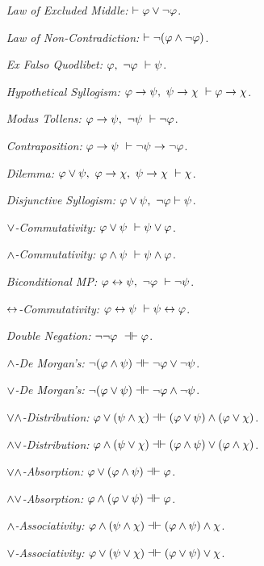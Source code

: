 \documentclass[a4paper, 11pt]{article} %
\begin{document}
\begin{multicols}{2}
\begin{enumerate}[leftmargin=1.5in]
  \item[\it Law of Excluded Middle:] $\vdash \varphi\vee\neg\varphi$.
  \item[\it Law of Non-Contradiction:] $\vdash \neg(\varphi\wedge\neg\varphi)$.
  \item[\it Ex Falso Quodlibet:] $\varphi,\ \neg\varphi\ \vdash \psi$.
  \item[\it Hypothetical Syllogism:] $\metaA \eif \metaB,\ \metaB \eif \metaC\ \vdash \metaA \eif \metaC$.
  \item[\it Modus Tollens:] $\varphi \rightarrow \psi,\ \neg\psi\ \vdash \neg\varphi$.
  \item[\it Contraposition:] $\varphi \rightarrow \psi\ \vdash \neg\psi \rightarrow \neg\varphi$.
  \item[\it Dilemma:] $\varphi \vee \psi,\ \varphi \rightarrow \chi,\ \psi \rightarrow \chi\ \vdash \chi$.
  \item[\it Disjunctive Syllogism:] $\varphi \vee \psi,\ \neg \varphi \vdash \psi$.
  \item[\it $\vee$-Commutativity:] $\varphi \vee \psi\ \vdash \psi \vee \varphi$.
  \item[\it $\wedge$-Commutativity:] $\varphi \wedge \psi\ \vdash \psi \wedge \varphi$.
  \item[\it Biconditional MP:] $\varphi \leftrightarrow \psi,\ \neg\varphi\ \vdash \neg\psi$.
  \item[\it $\leftrightarrow$-Commutativity:] $\varphi \leftrightarrow \psi\ \vdash \psi \leftrightarrow \varphi$.
  \item[\it Double Negation:] $\neg\neg\varphi\ \dashv\vdash \varphi$.
  \item[\it $\wedge$-De Morgan's:] $\neg(\varphi\wedge\psi)\dashv\vdash\neg\varphi\vee\neg\psi$.
  \item[\it $\vee$-De Morgan's:] $\neg(\varphi\vee\psi)\dashv\vdash\neg\varphi\wedge\neg\psi$.
  \item[\it ${\vee}{\wedge}$-Distribution:] $\varphi\vee(\psi\wedge\chi) \dashv\vdash (\varphi\vee\psi)\wedge(\varphi\vee\chi)$.
  \item[\it ${\wedge}{\vee}$-Distribution:] $\varphi\wedge(\psi\vee\chi) \dashv\vdash (\varphi\wedge\psi)\vee(\varphi\wedge\chi)$.
  \item[\it ${\vee}{\wedge}$-Absorption:] $\varphi\vee(\varphi\wedge\psi) \dashv\vdash \varphi$.
  \item[\it ${\wedge}{\vee}$-Absorption:] $\varphi\wedge(\varphi\vee\psi) \dashv\vdash \varphi$.
  \item[\it $\wedge$-Associativity:] $\varphi\wedge(\psi\wedge\chi) \dashv\vdash (\varphi\wedge\psi)\wedge\chi$.
  \item[\it $\vee$-Associativity:] $\varphi\vee(\psi\vee\chi) \dashv\vdash (\varphi\vee\psi)\vee\chi$.
\end{enumerate}





\end{multicols}
\end{document}
